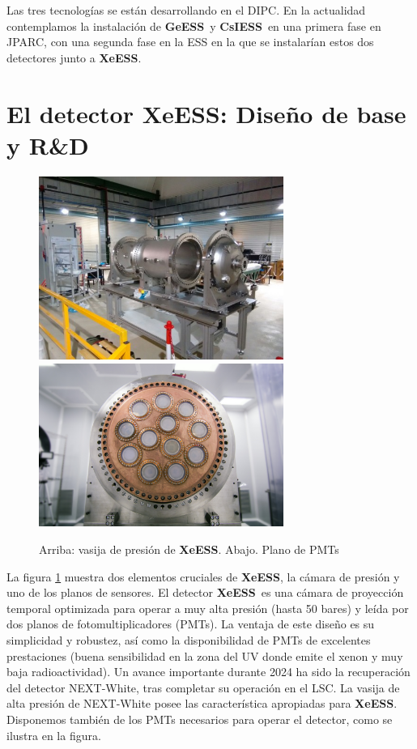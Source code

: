 \documentclass[12pt,a4paper,article]{report} %
\def\xess{{\bf XeESS}}
\def\gess{{\bf GeESS}}
\def\cess{{\bf CsIESS}}
\begin{document}
Las tres tecnologías se están desarrollando en el DIPC. En la actualidad contemplamos la instalación de \gess\ y \cess\ en una primera fase en JPARC, con una segunda fase en la ESS en la que se instalarían estos dos detectores junto a  \xess.  

\section*{El detector \xess: Diseño de base y R\&D}

\begin{figure}[bht!]
\begin{center}
\includegraphics[width=8cm]{img/vessel2.jpg}
\includegraphics[width=8cm]{img/ep-new.jpg}

\caption{Arriba: vasija de presión de \xess. Abajo. Plano de PMTs}
\label{fig:xess}
\end{center}
\end{figure}

La figura \ref{fig:xess} muestra dos elementos cruciales de \xess, la cámara de presión y uno de los planos de sensores. El detector \xess\ es una cámara de proyección temporal optimizada para operar a muy alta presión (hasta 50 bares) y leída por dos planos de fotomultiplicadores (PMTs). La ventaja de este diseño es su simplicidad y robustez, así como la disponibilidad de PMTs de excelentes prestaciones (buena sensibilidad en la zona del UV donde emite el xenon y muy baja radioactividad). Un avance importante durante 2024 ha sido la recuperación del detector NEXT-White, tras completar su operación en el LSC. La vasija de alta presión de NEXT-White posee las característica apropiadas para \xess. Disponemos también de los PMTs necesarios para operar el detector, como se ilustra en la figura. 
\end{document}
